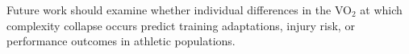 \documentclass[12pt,a4paper]{article}
\begin{document}
Future work should examine whether individual differences in the VO$_2$ at which complexity collapse occurs predict training adaptations, injury risk, or performance outcomes in athletic populations.





\end{document}

